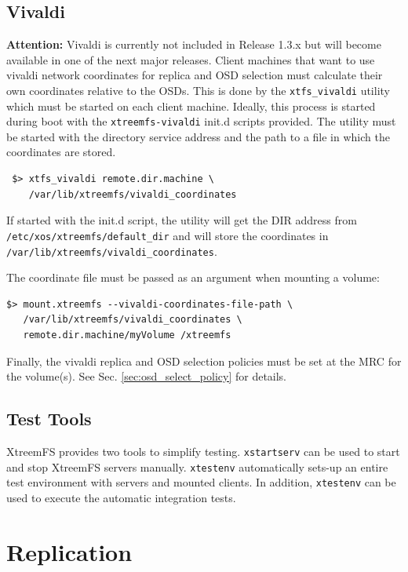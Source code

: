 \documentclass[a4paper,10pt]{book}
\begin{document}
\section{Vivaldi}
\label{sec:vivaldi}
\textbf{Attention:} Vivaldi is currently not included in Release 1.3.x but will become available in one of the next major releases.
Client machines that want to use vivaldi network coordinates for replica and OSD selection must calculate their own coordinates relative to the OSDs. This is done by the \texttt{xtfs\_vivaldi} utility which must be started on each client machine. Ideally, this process is started during boot with the \texttt{xtreemfs-vivaldi} init.d scripts provided. The utility must be started with the directory service address and the path to a file in which the coordinates are stored.

\begin{verbatim}
 $> xtfs_vivaldi remote.dir.machine \
    /var/lib/xtreemfs/vivaldi_coordinates
\end{verbatim}

If started with the init.d script, the utility will get the DIR address from\\ \texttt{/etc/xos/xtreemfs/default\_dir} and will store the coordinates in\\ \texttt{/var/lib/xtreemfs/vivaldi\_coordinates}.

The coordinate file must be passed as an argument when mounting a volume:

\begin{verbatim}
$> mount.xtreemfs --vivaldi-coordinates-file-path \
   /var/lib/xtreemfs/vivaldi_coordinates \
   remote.dir.machine/myVolume /xtreemfs
\end{verbatim}

Finally, the vivaldi replica and OSD selection policies must be set at the MRC for the volume(s). See Sec. \ref{sec:osd_select_policy} for details.

\section{Test Tools}
XtreemFS provides two tools to simplify testing. \texttt{xstartserv} can be used to start and stop XtreemFS servers manually. \texttt{xtestenv} automatically sets-up an entire test environment with servers and mounted clients. In addition, \texttt{xtestenv} can be used to execute the automatic integration tests.

\chapter{Replication}
\end{document}
